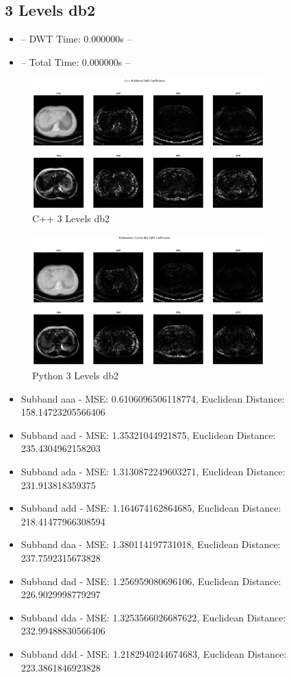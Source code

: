 \documentclass{article}
\begin{document}
\subsection{3 Levels db2}
\begin{itemize}
    \item -- DWT Time: 0.000000s --
    \item -- Total Time: 0.000000s --
\end{itemize}


\begin{figure}[H]
    \centering
    \includegraphics[width=0.8\textwidth]{assets/cpp-3-db2.png}
    \caption{C++ 3 Levels db2}
    \label{fig15}
\end{figure}

\begin{figure}[H]
    \centering
    \includegraphics[width=0.8\textwidth]{assets/py-3-db2.png}
    \caption{Python 3 Levels db2}
    \label{fig16}
\end{figure}

\begin{itemize}
    \item Subband aaa - MSE: 0.6106096506118774, Euclidean Distance: 158.14723205566406
    \item Subband aad - MSE: 1.35321044921875, Euclidean Distance: 235.4304962158203
    \item Subband ada - MSE: 1.3130872249603271, Euclidean Distance: 231.913818359375
    \item Subband add - MSE: 1.164674162864685, Euclidean Distance: 218.41477966308594
    \item Subband daa - MSE: 1.380114197731018, Euclidean Distance: 237.7592315673828
    \item Subband dad - MSE: 1.256959080696106, Euclidean Distance: 226.9029998779297
    \item Subband dda - MSE: 1.3253566026687622, Euclidean Distance: 232.99488830566406
    \item Subband ddd - MSE: 1.2182940244674683, Euclidean Distance: 223.3861846923828
\end{itemize}

\pagebreak



\end{document}
